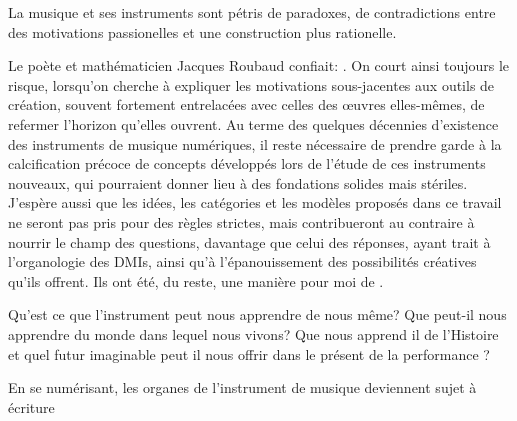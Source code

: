 La musique et ses instruments sont pétris de paradoxes, de contradictions entre des motivations passionelles et une construction plus rationelle.


\noindent Le poète et mathématicien Jacques Roubaud confiait: . On court ainsi toujours le risque, lorsqu'on cherche à expliquer les motivations sous-jacentes aux outils de création, souvent fortement entrelacées avec celles des œuvres elles-mêmes, de refermer l'horizon qu'elles ouvrent. 
Au terme des quelques décennies d'existence des instruments de musique numériques, il reste nécessaire de prendre garde à la calcification précoce de concepts développés lors de l'étude de ces instruments nouveaux, qui pourraient donner lieu à des fondations solides mais stériles. J'espère aussi que les idées, les catégories et les modèles proposés dans ce travail ne seront pas pris pour des règles strictes, mais contribueront au contraire à nourrir le champ des questions, davantage que celui des réponses, ayant trait à l'organologie des \glspl{DMI}, ainsi qu'à l'épanouissement des possibilités créatives qu'ils offrent. Ils ont été, du reste, une manière pour moi de .


Qu'est ce que l'instrument peut nous apprendre de nous même? Que peut-il nous apprendre du monde dans lequel nous vivons? Que nous apprend il de l'Histoire et quel futur imaginable peut il nous offrir dans le présent de la performance ?


En se numérisant, les organes de l'instrument de musique deviennent sujet à écriture

